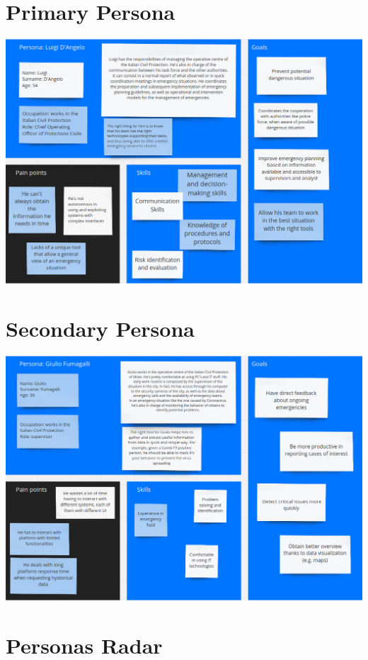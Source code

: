 \documentclass[../main.tex]{subfiles}
\begin{document}
    \section{Primary Persona}\label{sec:primary-persona}
    \includegraphics[scale = 0.45]{assets/primary.png}
    \section{Secondary Persona}\label{sec:secondary-persona}
    \includegraphics[scale = 0.45]{assets/secondary.png}
    \section{Personas Radar}\label{sec:personas-radar}
\end{document}
